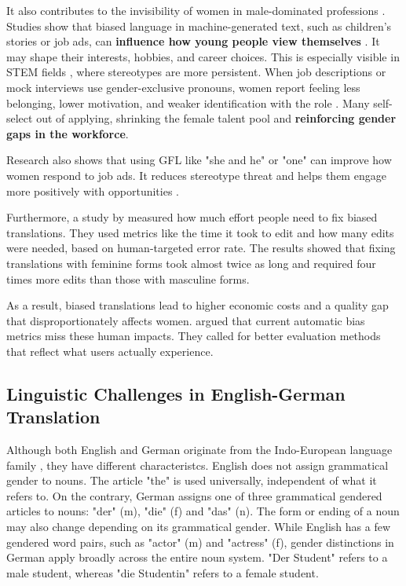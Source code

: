     It also contributes to the invisibility of women in male-dominated professions \citep{kapplAreAllSpanish2025}. Studies show that biased language in machine-generated text, such as children’s stories or job ads, can \textbf{influence how young people view themselves} \citep{soundararajanInvestigatingGenderBias2024,kapplAreAllSpanish2025}. It may shape their interests, hobbies, and career choices. This is especially visible in STEM fields \citep{pratesAssessingGenderBias2019}, where stereotypes are more persistent. When job descriptions or mock interviews use gender-exclusive pronouns, women report feeling less belonging, lower motivation, and weaker identification with the role \citep{godsilEffectsGenderRoles2016}. Many self-select out of applying, shrinking the female talent pool and \textbf{reinforcing gender gaps in the workforce}.

    Research also shows that using GFL like "she and he" or "one" can improve how women respond to job ads. It reduces stereotype threat and helps them engage more positively with opportunities \citep{godsilEffectsGenderRoles2016}.

    Furthermore, a study by \citet{savoldiWhatHarmQuantifying2024} measured how much effort people need to fix biased translations. They used metrics like the time it took to edit and how many edits were needed, based on human-targeted error rate. The results showed that fixing translations with feminine forms took almost twice as long and required four times more edits than those with masculine forms.

    As a result, biased translations lead to higher economic costs and a quality gap that disproportionately affects women. \citeauthor{savoldiWhatHarmQuantifying2024} argued that current automatic bias metrics miss these human impacts. They called for better evaluation methods that reflect what users actually experience.

\subsection{Linguistic Challenges in English-German Translation}
    Although both English and German originate from the Indo-European language family \citep{baldiEnglishIndoEuropeanLanguage2008}, they have different characteristcs. English does not assign grammatical gender to nouns. The article "the" is used universally, independent of what it refers to. On the contrary, German assigns one of three grammatical gendered articles to nouns: "der" (m), "die" (f) and "das" (n). The form or ending of a noun may also change depending on its grammatical gender. While English has a few gendered word pairs, such as "actor" (m) and "actress" (f), gender distinctions in German apply broadly across the entire noun system. "Der Student" refers to a male student, whereas "die Studentin" refers to a female student. 

